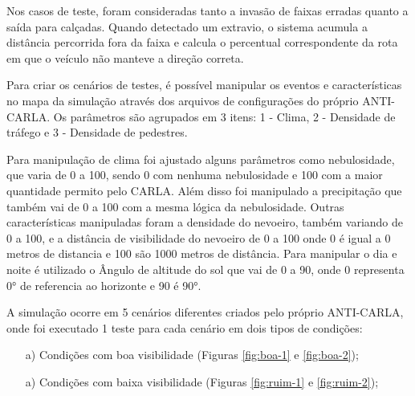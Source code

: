 \documentclass[a4paper,12pt,Times]{article}
\begin{document}

Nos casos de teste, foram consideradas tanto a invasão de faixas erradas quanto a saída para calçadas. Quando detectado um extravio, o sistema acumula a distância percorrida fora da faixa e calcula o percentual correspondente da rota em que o veículo não manteve a direção correta.


Para criar os cenários de testes, é possível manipular os eventos e características no mapa da simulação através dos arquivos de configurações do próprio ANTI-CARLA. Os parâmetros são agrupados em 3 itens: 1 - Clima, 2 - Densidade de tráfego e 3 - Densidade de pedestres.


Para manipulação de clima foi ajustado alguns parâmetros como nebulosidade, que varia de 0 a 100, sendo 0 com nenhuma nebulosidade e 100 com a maior quantidade permito pelo CARLA. Além disso foi manipulado a precipitação que também vai de 0 a 100 com a mesma lógica da nebulosidade. Outras características manipuladas foram a densidade do nevoeiro, também variando de 0 a 100, e a distância de visibilidade do nevoeiro de 0 a 100 onde 0 é igual a 0 metros de distancia e 100 são 1000 metros de distância. Para manipular o dia e noite é utilizado o Ângulo de altitude do sol que vai de 0 a 90, onde 0 representa 0° de referencia ao horizonte e 90 é 90°.

A simulação ocorre em 5 cenários diferentes criados pelo próprio ANTI-CARLA, onde foi executado 1 teste para cada cenário em dois tipos de condições:

\begin{enumerate}
    \item[a)] Condições com boa visibilidade (Figuras \ref{fig:boa-1} e \ref{fig:boa-2});
    \item[a)] Condições com baixa visibilidade (Figuras \ref{fig:ruim-1} e \ref{fig:ruim-2});
\end{enumerate}
\end{document}
